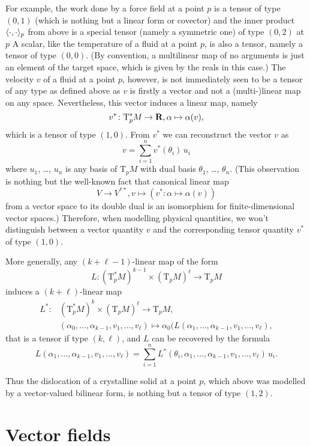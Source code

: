 For example, the work done by a force field at a point $p$ is a tensor of type
$(0, 1)$ (which is nothing but a linear form or covector) and
the inner product $\langle\cdot, \cdot\rangle_p$ from above is a special
tensor (namely a symmetric one) of type $(0, 2)$ at $p$
 A scalar, like the temperature of a fluid at
a point $p$, is also a tensor, namely a tensor of type $(0, 0)$. (By convention,
a multilinear map of no arguments is just an element of the target space, which
is given by the reals in this case.)
The velocity $v$ of a fluid at a point $p$, however, is not immediately seen to be
a tensor of any type as defined above as $v$ is firstly a vector and not a
(multi-)linear map on any space. Nevertheless, this vector induces a linear
map, namely
\[
  v^*\colon \mathrm T^*_p M \to \mathbf{R}, \alpha \mapsto \alpha(v),
\]
which is a tensor of type $(1, 0)$. From $v^*$ we can reconstruct the vector
$v$ as
\[
  v = \sum_{i = 1}^n v^*(\theta_i) \, u_i
\]
where $u_1$, \dots, $u_n$ is any basis of $\mathrm T_p M$ with dual basis
$\theta_1$, \dots, $\theta_n$. (This observation is
nothing but the well-known fact that canonical linear map
\[
  V \to V^{**}, v \mapsto (v^*\colon \alpha \mapsto \alpha(v))
\]
from a vector space to its double dual is an isomorphism for finite-dimensional
vector spaces.) Therefore, when modelling physical quantities, we won't
distinguish between a vector quantity $v$ and the corresponding tensor quantity
$v^*$ of type $(1, 0)$.

More generally, any $(k + \ell - 1)$-linear map of the form
\[
  L\colon (\mathrm T_p^* M)^{k - 1} \times (\mathrm T_p M)^\ell \to \mathrm T_p M
\]
induces a $(k + \ell)$-linear map
\[
  \begin{aligned}
    L^*\colon & (\mathrm T_p^* M)^k \times (\mathrm T_p M)^\ell \to \mathrm T_p M, \\
    & (\alpha_0, \dotsc, \alpha_{k - 1}, v_1, \dotsc, v_\ell) \mapsto
    \alpha_0(L(\alpha_1, \dotsc, \alpha_{k - 1}, v_1, \dotsc, v_\ell),
  \end{aligned}
\]
that is a tensor if type $(k, \ell)$, and $L$ can be recovered by the formula
\[
  L(\alpha_1, \dotsc, \alpha_{k - 1}, v_1, \dotsc, v_\ell)
  = \sum_{i = 1}^n L^*(\theta_i, \alpha_1, \dotsc, \alpha_{k - 1}, v_1, \dotsc,
  v_\ell) \, u_i.
\]

Thus the dislocation of a crystalline solid at a point $p$, which above
was modelled by a vector-valued bilinear form, is nothing but a tensor of
type $(1, 2)$. 

\section{Vector fields}

